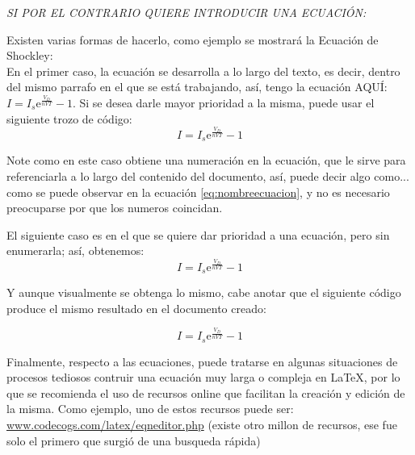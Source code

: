 \documentclass[a4paper, twocolumn, 11pt]{article}
\begin{document}
\emph{SI POR EL CONTRARIO QUIERE INTRODUCIR UNA ECUACIÓN:}

Existen varias formas de hacerlo, como ejemplo se mostrará la Ecuación de Shockley:\\

En el primer caso, la ecuación se desarrolla a lo largo del texto, es decir, dentro del mismo parrafo en el que se está trabajando, así, tengo la ecuación AQUÍ: $I=I_{s}{\mathrm{e}^{\frac{V_{D}}{nVT}}-1}$. Si se desea darle mayor prioridad a la misma, puede usar el siguiente trozo de código:\\

\begin{equation}
\label{eq:nombreecuacion}
  I=I_{s}{\mathrm{e}^{\frac{V_{D}}{nVT}}-1}
\end{equation}

Note como en este caso obtiene una numeración en la ecuación, que le sirve para referenciarla a lo largo del contenido del documento, así, puede decir algo como... como se puede observar en la ecuación \ref{eq:nombreecuacion}, y no es necesario preocuparse por que los numeros coincidan.

El siguiente caso es en el que se quiere dar prioridad a una ecuación, pero sin enumerarla; así, obtenemos:
\[
	I=I_{s}{\mathrm{e}^{\frac{V_{D}}{nVT}}-1}
\]

Y aunque visualmente se obtenga lo mismo, cabe anotar que el siguiente código produce el mismo resultado en el documento creado:

\begin{equation*}
\label{eq:nombreecuacion1}
  I=I_{s}{\mathrm{e}^{\frac{V_{D}}{nVT}}-1}
\end{equation*}

Finalmente, respecto a las ecuaciones, puede tratarse en algunas situaciones de procesos tediosos contruir una ecuación muy larga o compleja en \LaTeX, por lo que se recomienda el uso de recursos online que facilitan la creación y edición de la misma.
Como ejemplo, uno de estos recursos puede ser: \url{www.codecogs.com/latex/eqneditor.php} (existe otro millon de recursos, ese fue solo el primero que surgió de una busqueda rápida)

\end{document}
